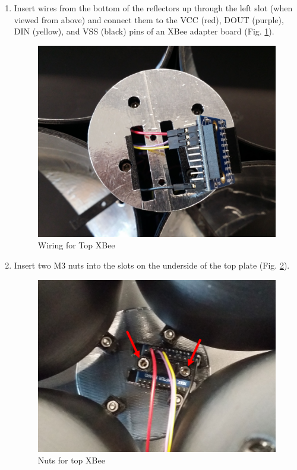 \begin{enumerate}[label = \textbf{Step \arabic*.}]
    \item Insert wires from the bottom of the reflectors up through the left slot (when viewed from above) and connect them to the VCC (red), DOUT (purple), DIN (yellow), and VSS (black) pins of an XBee adapter board (Fig. \ref{fig:topXBeeWiring}).
    \begin{figure}[H]
        \centering
        \includegraphics[width=4.2in]{figs/img/assembly/16-topXBeeWiring.jpg}
        \caption{Wiring for Top XBee}
        \label{fig:topXBeeWiring}
    \end{figure}

    \item Insert two M3 nuts into the slots on the underside of the top plate (Fig. \ref{fig:topXBeeNuts}).
    \begin{figure}[H]
        \centering
        \includegraphics[width=4.2in]{figs/img/assembly/17-topXBeeNuts.png}
        \caption{Nuts for top XBee}
        \label{fig:topXBeeNuts}
    \end{figure}
    \pagebreak


\end{enumerate}
